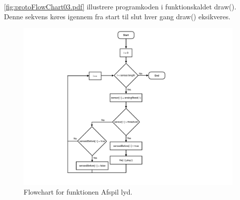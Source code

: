 \autoref{fig:protoFlowChart03.pdf} illustrere programkoden i funktionskaldet draw(). Denne sekvens køres igennem fra start til slut hver gang draw() eksikveres.            

\begin{figure}[H]
\centering
\includegraphics[scale=0.5]{Figure/protoFlowChart03.pdf}
\caption{
Flowchart for funktionen Afspil lyd. }
\label{fig:protoFlowChart03.pdf}
\end{figure}

 